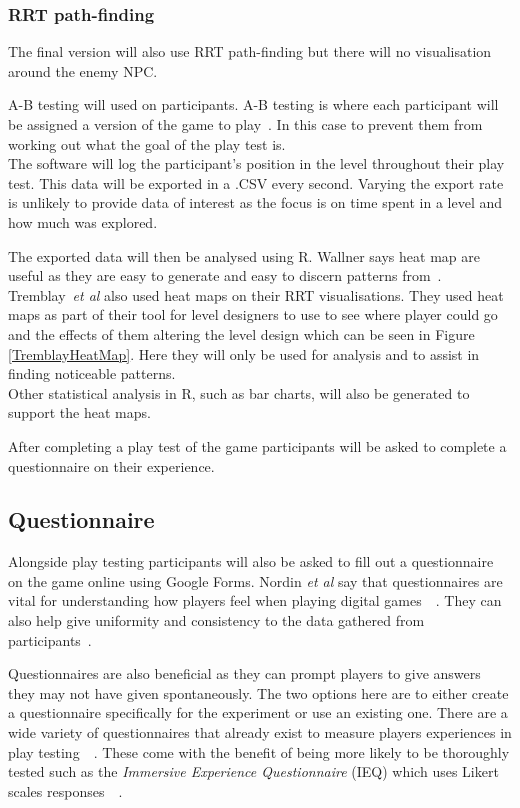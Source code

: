 \documentclass[journal]{IEEEtran}
\begin{document}
\subsubsection{RRT path-finding}
The final version will also use RRT path-finding but there will no visualisation around the enemy NPC.

A-B testing will used on participants. A-B testing is where each participant will be assigned a version of the game to play~\cite{Hynninen2014}. In this case to prevent them from working out what the goal of the play test is. 
\\
The software will log the participant's position in the level throughout their play test. This data will be exported in a .CSV every second. Varying the export rate is unlikely to provide data of interest as the focus is on time spent in a level and how much was explored. 

The exported data will then be analysed using R. Wallner says heat map are useful as they are easy to generate and easy to discern patterns from~\cite{Wallner2015}.  Tremblay~\textit{et al} also used heat maps on their RRT visualisations. They used heat maps as part of their tool for level designers to use to see where player could go and the effects of them altering the level design which can be seen in Figure \ref{TremblayHeatMap}. Here they will only be used for analysis and to assist in finding noticeable patterns.
\\
Other statistical analysis in R, such as bar charts, will also be generated to support the heat maps.
 
After completing a play test of the game participants will be asked to complete a questionnaire on their experience.\\

\subsection{Questionnaire}
Alongside play testing participants will also be asked to fill out a questionnaire on the game online using Google Forms. Nordin \textit{et al} say that questionnaires are vital for understanding how players feel when playing digital games~\cite{nordin2014}~\cite{Denisova2016}. They can also help give uniformity and consistency to the data gathered from participants~\cite{Denisova2016}.

Questionnaires are also beneficial as they can prompt players to give answers they may not have given spontaneously. The two options here are to either create a questionnaire specifically for the experiment or use an existing one. There are a wide variety of questionnaires that already exist to measure players experiences in play testing~\cite{nordin2014}~\cite{Jennett2008}. These come with the benefit of being more likely to be thoroughly tested such as the \textit{Immersive  Experience
Questionnaire} (IEQ) which uses Likert scales responses~\cite{nordin2014}~\cite{Jennett2008}.
 
\end{document}

